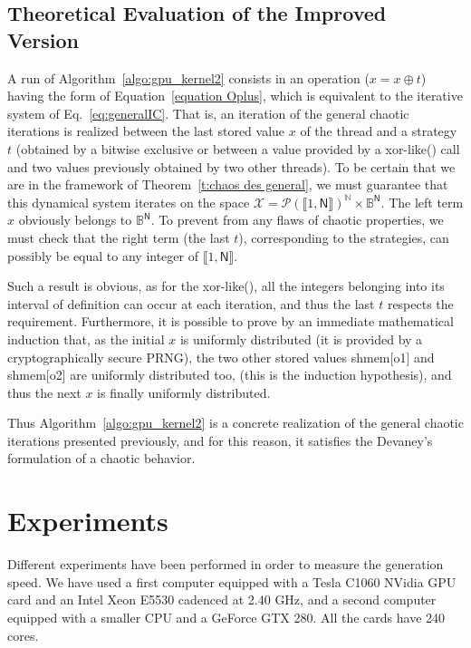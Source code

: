 \documentclass{article}
\begin{document}
\subsection{Theoretical Evaluation of the Improved Version}

A run of Algorithm~\ref{algo:gpu_kernel2} consists in an operation ($x=x\oplus t$) having 
the form of Equation~\ref{equation Oplus}, which is equivalent to the iterative
system of Eq.~\ref{eq:generalIC}. That is, an iteration of the general chaotic
iterations is realized between the last stored value $x$ of the thread and a strategy $t$
(obtained by a bitwise exclusive or between a value provided by a xor-like() call
and two values previously obtained by two other threads).
To be certain that we are in the framework of Theorem~\ref{t:chaos des general},
we must guarantee that this dynamical system iterates on the space 
$\mathcal{X} = \mathcal{P}\left(\llbracket 1, \mathsf{N} \rrbracket\right)^\mathds{N}\times\mathds{B}^\mathsf{N}$.
The left term $x$ obviously belongs to $\mathds{B}^ \mathsf{N}$.
To prevent from any flaws of chaotic properties, we must check that the right 
term (the last $t$), corresponding to the strategies,  can possibly be equal to any
integer of $\llbracket 1, \mathsf{N} \rrbracket$. 

Such a result is obvious, as for the xor-like(), all the
integers belonging into its interval of definition can occur at each iteration, and thus the 
last $t$ respects the requirement. Furthermore, it is possible to
prove by an immediate mathematical induction that, as the initial $x$
is uniformly distributed (it is provided by a cryptographically secure PRNG),
the two other stored values shmem[o1] and shmem[o2] are uniformly distributed too,
(this is the induction hypothesis), and thus the next $x$ is finally uniformly distributed.

Thus Algorithm~\ref{algo:gpu_kernel2} is a concrete realization of the general
chaotic iterations presented previously, and for this reason, it satisfies the 
Devaney's formulation of a chaotic behavior.

\section{Experiments}
\label{sec:experiments}

Different experiments  have been  performed in order  to measure  the generation
speed. We have used a first computer equipped with a Tesla C1060 NVidia  GPU card
and an
Intel  Xeon E5530 cadenced  at 2.40  GHz,  and 
a second computer  equipped with a smaller  CPU and  a GeForce GTX  280. 
All the
cards have 240 cores.
\end{document}
